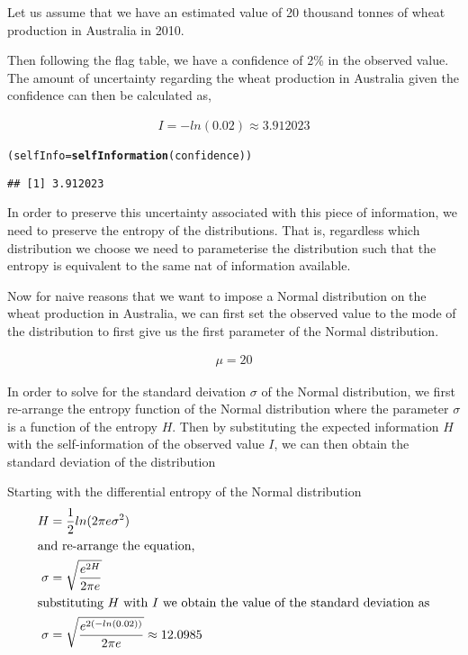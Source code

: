 \documentclass[nojss]{jss}\usepackage[]{graphicx}\usepackage[]{color}
\makeatletter
\newcommand{\hlstd}[1]{\textcolor[rgb]{0.345,0.345,0.345}{#1}}%
\newcommand{\hlkwb}[1]{\textcolor[rgb]{0.69,0.353,0.396}{#1}}%
\newcommand{\hlkwd}[1]{\textcolor[rgb]{0.737,0.353,0.396}{\textbf{#1}}}%
\newenvironment{kframe}{%
 \def\at@end@of@kframe{}%
 \ifinner\ifhmode%
  \def\at@end@of@kframe{\end{minipage}}%
  \begin{minipage}{\columnwidth}%
 \fi\fi%
 \def\FrameCommand##1{\hskip\@totalleftmargin \hskip-\fboxsep
 \colorbox{shadecolor}{##1}\hskip-\fboxsep
     \hskip-\linewidth \hskip-\@totalleftmargin \hskip\columnwidth}%
 \MakeFramed {\advance\hsize-\width
   \@totalleftmargin\z@ \linewidth\hsize
   \@setminipage}}%
 {\par\unskip\endMakeFramed%
 \at@end@of@kframe}
\newenvironment{knitrout}{}{} %
\makeatother
\begin{document}
Let us assume that we have an estimated value of 20
thousand tonnes of wheat production in Australia in 2010.


Then following the flag table, we have a confidence of
2\% in the observed value. The amount of
uncertainty regarding the wheat production in Australia given the
confidence can then be calculated as,

\begin{align}
  I = -ln(0.02) \approx 3.912023 \nonumber
\end{align}

\begin{knitrout}
\color{fgcolor}\begin{kframe}
\begin{alltt}
\hlstd{(selfInfo} \hlkwb{=} \hlkwd{selfInformation}\hlstd{(confidence))}
\end{alltt}
\begin{verbatim}
## [1] 3.912023
\end{verbatim}
\end{kframe}
\end{knitrout}

In order to preserve this uncertainty associated with this piece of
information, we need to preserve the entropy of the
distributions. That is, regardless which distribution we choose we
need to parameterise the distribution such that the entropy is
equivalent to the same nat of information available.

Now for naive reasons that we want to impose a Normal distribution on
the wheat production in Australia, we can first set the observed value
to the mode of the distribution to first give us the first parameter
of the Normal distribution.

\begin{align}
  \mu = 20
\end{align}


In order to solve for the standard deivation $\sigma$ of the Normal
distribution, we first re-arrange the entropy function of the Normal
distribution where the parameter $\sigma$ is a function of the entropy
$H$. Then by substituting the expected information $H$ with the
self-information of the observed value $I$, we can then obtain the
standard deviation of the distribution

Starting with the differential entropy of the Normal distribution
\begin{align}
  H &= \frac{1}{2}ln(2\pi e\sigma^2) \nonumber\\
  \intertext{and re-arrange the equation,}
  \sigma &= \sqrt{\frac{e^{2H}}{2\pi e}} \nonumber\\
  \intertext{substituting $H$ with $I$ we obtain the value of the standard deviation as}
  \sigma &= \sqrt{\frac{e^{2(-ln(0.02))}}{2\pi e}} \approx 12.0985 \nonumber
\end{align}
\end{document}
